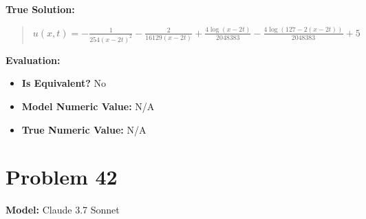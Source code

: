\documentclass{article}
\begin{document}
\textbf{True Solution:}
\begin{quote}
$u(x,t)=-\frac{1}{254 (x-2t)^2}-\frac{2}{16129 (x-2t)}+\frac{4 \log (x-2t)}{2048383}-\frac{4 \log (127-2 (x-2t))}{2048383}+5$
\end{quote}

\textbf{Evaluation:}
\begin{itemize}
\item \textbf{Is Equivalent?} No
\item \textbf{Model Numeric Value:} N/A
\item \textbf{True Numeric Value:} N/A
\end{itemize}
\vspace{1cm}
\section*{Problem 42}
\textbf{Model:} Claude 3.7 Sonnet
\end{document}
